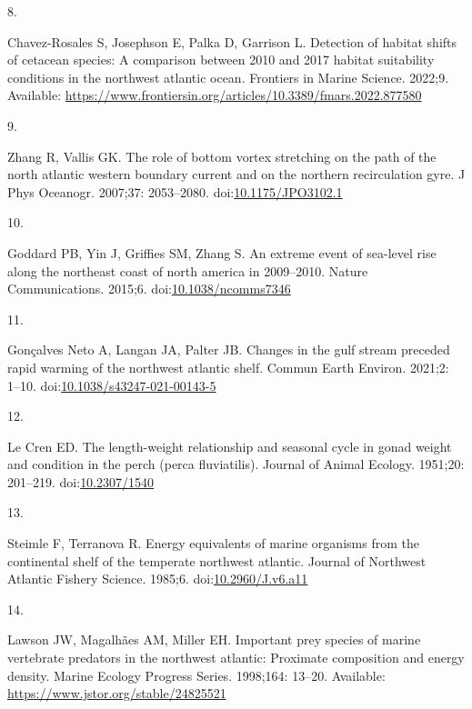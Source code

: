 \documentclass[
  10pt,
]{article}
\newlength{\cslhangindent}
\newlength{\csllabelwidth}
\newlength{\cslentryspacingunit} %
\newenvironment{CSLReferences}[2] %
 {%
  \setlength{\parindent}{0pt}
  \ifodd #1
  \let\oldpar\par
  \def\par{\hangindent=\cslhangindent\oldpar}
  \fi
  \setlength{\parskip}{#2\cslentryspacingunit}
 }%
 {}
\newcommand{\CSLLeftMargin}[1]{\parbox[t]{\csllabelwidth}{#1}}
\newcommand{\CSLRightInline}[1]{\parbox[t]{\linewidth - \csllabelwidth}{#1}\break}
\begin{document}
\begin{CSLReferences}{0}{0}
\leavevmode{}%
\CSLLeftMargin{8. }%
\CSLRightInline{Chavez-Rosales S, Josephson E, Palka D, Garrison L. Detection of habitat shifts of cetacean species: A comparison between 2010 and 2017 habitat suitability conditions in the northwest atlantic ocean. Frontiers in Marine Science. 2022;9. Available: \url{https://www.frontiersin.org/articles/10.3389/fmars.2022.877580}}

\leavevmode{}%
\CSLLeftMargin{9. }%
\CSLRightInline{Zhang R, Vallis GK. The role of bottom vortex stretching on the path of the north atlantic western boundary current and on the northern recirculation gyre. J Phys Oceanogr. 2007;37: 2053--2080. doi:\href{https://doi.org/10.1175/JPO3102.1}{10.1175/JPO3102.1}}

\leavevmode{}%
\CSLLeftMargin{10. }%
\CSLRightInline{Goddard PB, Yin J, Griffies SM, Zhang S. An extreme event of sea-level rise along the northeast coast of north america in 2009--2010. Nature Communications. 2015;6. doi:\href{https://doi.org/10.1038/ncomms7346}{10.1038/ncomms7346}}

\leavevmode{}%
\CSLLeftMargin{11. }%
\CSLRightInline{Gonçalves Neto A, Langan JA, Palter JB. Changes in the gulf stream preceded rapid warming of the northwest atlantic shelf. Commun Earth Environ. 2021;2: 1--10. doi:\href{https://doi.org/10.1038/s43247-021-00143-5}{10.1038/s43247-021-00143-5}}

\leavevmode{}%
\CSLLeftMargin{12. }%
\CSLRightInline{Le Cren ED. The length-weight relationship and seasonal cycle in gonad weight and condition in the perch (perca fluviatilis). Journal of Animal Ecology. 1951;20: 201--219. doi:\href{https://doi.org/10.2307/1540}{10.2307/1540}}

\leavevmode{}%
\CSLLeftMargin{13. }%
\CSLRightInline{Steimle F, Terranova R. Energy equivalents of marine organisms from the continental shelf of the temperate northwest atlantic. Journal of Northwest Atlantic Fishery Science. 1985;6. doi:\href{https://doi.org/10.2960/J.v6.a11}{10.2960/J.v6.a11}}

\leavevmode{}%
\CSLLeftMargin{14. }%
\CSLRightInline{Lawson JW, Magalhães AM, Miller EH. Important prey species of marine vertebrate predators in the northwest atlantic: Proximate composition and energy density. Marine Ecology Progress Series. 1998;164: 13--20. Available: \url{https://www.jstor.org/stable/24825521}}


\end{CSLReferences}
\end{document}

